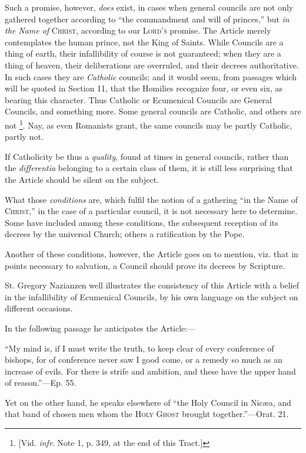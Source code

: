Such a promise, however, \emph{does} exist, in cases when general
councils are not only gathered together according to ``the
commandment and will of princes,'' but \emph{in the Name of} C\textsc{hrist},
according to our L\textsc{ord's} promise. The Article
merely contemplates the human prince, not the King of Saints. While
Councils are a thing of earth, their infallibility of course is
not guaranteed; when they are a thing of heaven, their deliberations
are overruled, and their decrees authoritative. In such cases they are
\emph{Catholic} councils; and it would seem, from passages which will
be quoted in Section 11, that the Homilies recognize four, or even
six, as bearing this character. Thus Catholic or Ecumenical Councils
are General Councils, and something more. Some general councils are
Catholic, and others are not \footnote{[Vid. \emph{infr}. Note
1, p. 349, at the
end of this Tract.]}.
Nay, as even Romanists grant, the same councils may be partly
Catholic, partly not.

If Catholicity be thus a \emph{quality}, found at times in general
councils, rather than the \emph{differentia} belonging to a certain
class of them, it is still less surprising that the Article should be
silent on the subject.

What those \emph{conditions} are, which fulfil the notion of a
gathering ``in the Name of C\textsc{hrist},'' in
the case of a particular council, it is not necessary here to
determine. Some have included among these conditions, the subsequent
reception of its decrees by the universal Church; others a
ratification by the Pope.

Another of these conditions, however, the Article goes on to
mention, viz. that in points necessary to salvation, a Council should
prove its decrees by Scripture.

St. Gregory Nazianzen well illustrates the consistency of this
Article with a belief in the infallibility of Ecumenical Councils, by
his own language on the subject on different occasions.

In the following passage he anticipates the Article:—

``My mind is, if I must write the truth, to keep
clear of every conference of bishops, for of conference never saw I
good come, or a remedy so much as an increase of evils. For there is
strife and ambition, and these have the upper hand of reason.''—Ep.
55.

Yet on the other hand, he speaks elsewhere of ``the Holy
Council in Nicæa, and that band of chosen men whom the H\textsc{oly}
G\textsc{host} brought together.''—Orat. 21.

